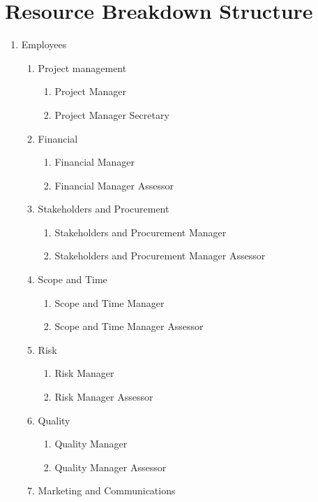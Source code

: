 \section{Resource Breakdown Structure}

\begin{enumerate}[label*=\arabic*.]
	\item Employees
	\begin{enumerate}[label*=\arabic*.]
		\item Project management
		\begin{enumerate}[label*=\arabic*.]
			\item Project Manager
			\item Project Manager Secretary
		\end{enumerate}
		\item Financial
		\begin{enumerate}[label*=\arabic*.]
			\item Financial Manager
			\item Financial Manager Assessor
		\end{enumerate}
		\item Stakeholders and Procurement
		\begin{enumerate}[label*=\arabic*.]
			\item Stakeholders and Procurement Manager
			\item Stakeholders and Procurement Manager Assessor
		\end{enumerate}
		\item Scope and Time
		\begin{enumerate}[label*=\arabic*.]
			\item Scope and Time Manager
			\item Scope and Time Manager Assessor
		\end{enumerate}
		\item Risk
		\begin{enumerate}[label*=\arabic*.]
			\item Risk Manager
			\item Risk Manager Assessor
		\end{enumerate}
		\item Quality
		\begin{enumerate}[label*=\arabic*.]
			\item Quality Manager
			\item Quality Manager Assessor
		\end{enumerate}
		\item Marketing and Communications

\end{enumerate}
\end{enumerate}

